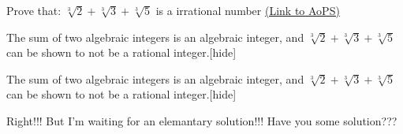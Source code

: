 \begin{problem}
	Prove that: $ \sqrt[3]{2}+ \sqrt[3]{3}+ \sqrt[3]{5}$ is a irrational number
	\flushright \href{https://artofproblemsolving.com/community/c6h480792}{(Link to AoPS)}
\end{problem}



\begin{solution}The sum of two algebraic integers is an algebraic integer, and $\sqrt[3]{2}+\sqrt[3]{3}+\sqrt[3]{5}$ can be shown to not be a rational integer.[\/hide]
\end{solution}



\begin{solution}
	\begin{tcolorbox}[hide="hint"]The sum of two algebraic integers is an algebraic integer, and $\sqrt[3]{2}+\sqrt[3]{3}+\sqrt[3]{5}$ can be shown to not be a rational integer.[\/hide]\end{tcolorbox}
Right!!!
But I'm waiting for an elemantary solution!!!
Have you some solution???
\end{solution}




